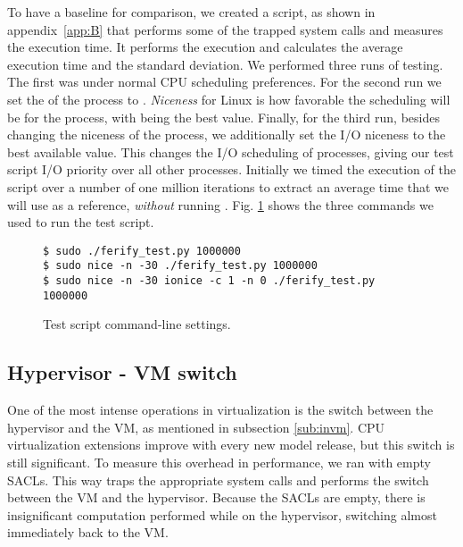 \par To have a baseline for comparison, we created a  script, as shown in appendix~\ref{app:B} that performs some of the trapped system calls and measures the execution time. It performs the execution and calculates the average execution time and the standard deviation. We performed three runs of testing. The first was under normal \ac{CPU} scheduling preferences. For the second run we set the  of the process to . \emph{Niceness} for Linux is how favorable the scheduling will be for the process, with  being the best value. Finally, for the third run, besides changing the niceness of the process, we additionally set the I/O niceness to the best available value. This changes the I/O scheduling of processes, giving our test script I/O priority over all other processes. Initially we timed the execution of the script over a number of one million iterations to extract an average time that we will use as a reference, \emph{without} running . Fig. \ref{fig:script} shows the three commands we used to run the test script.

\begin{figure}[ht]
	\centering
	\footnotesize{\selectfont 
		\begin{lstlisting}
$ sudo ./ferify_test.py 1000000
$ sudo nice -n -30 ./ferify_test.py 1000000
$ sudo nice -n -30 ionice -c 1 -n 0 ./ferify_test.py 1000000
	\end{lstlisting}}
	\caption{Test script command-line settings.}
	\label{fig:script}
\end{figure}


\subsection{Hypervisor - \ac{VM} switch}

\par One of the most intense operations in virtualization is the switch between the hypervisor and the \ac{VM}, as mentioned in subsection \ref{sub:invm}. \ac{CPU} virtualization extensions improve with every new model release, but this switch is still significant. To measure this overhead in performance, we ran  with empty \acp{SACL}. This way  traps the appropriate system calls and performs the switch between the \ac{VM} and the hypervisor. Because the \acp{SACL} are empty, there is insignificant computation performed while on the hypervisor, switching almost immediately back to the \ac{VM}. 

